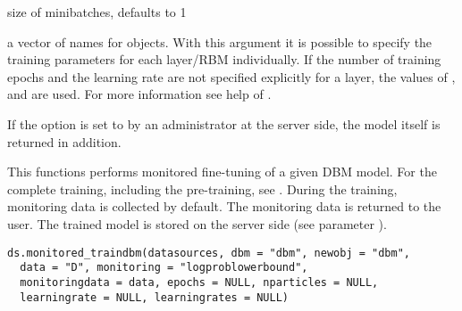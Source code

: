 \begin{Arguments}
\begin{ldescription}
\item[\code{batchsize}] size of minibatches, defaults to 1

\item[\code{trainlayers}] a vector of names for  objects.
With this argument it is possible
to specify the training parameters for each layer/RBM individually.
If the number of training epochs and the learning rate are not specified
explicitly for a layer, the values of , 
and  are used.
For more information see help of .
\end{ldescription}
\end{Arguments}
%
\begin{Details}\relax
If the option  is set to 
by an administrator at the server side, the model itself is returned in addition.
\end{Details}
%
\begin{Description}\relax
This functions performs monitored fine-tuning of a given DBM model.
For the complete training, including the pre-training, see .
During the training, monitoring data is collected by default.
The monitoring data is returned to the user.
The trained model is stored on the server side (see parameter ).
\end{Description}
%
\begin{Usage}
\begin{verbatim}
ds.monitored_traindbm(datasources, dbm = "dbm", newobj = "dbm",
  data = "D", monitoring = "logproblowerbound",
  monitoringdata = data, epochs = NULL, nparticles = NULL,
  learningrate = NULL, learningrates = NULL)
\end{verbatim}
\end{Usage}
%
